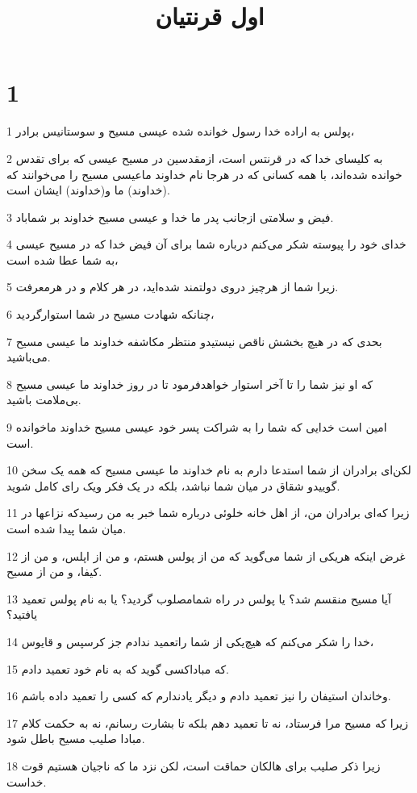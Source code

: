 

\title{اول قرنتيان}


\chapter{1}

\par 1 پولس به اراده خدا رسول خوانده شده عیسی مسیح و سوستانیس برادر،
\par 2 به کلیسای خدا که در قرنتس است، ازمقدسین در مسیح عیسی که برای تقدس خوانده شده‌اند، با همه کسانی که در هرجا نام خداوند ماعیسی مسیح را می‌خوانند که (خداوند) ما و(خداوند) ایشان است.
\par 3 فیض و سلامتی ازجانب پدر ما خدا و عیسی مسیح خداوند بر شماباد.
\par 4 خدای خود را پیوسته شکر می‌کنم درباره شما برای آن فیض خدا که در مسیح عیسی به شما عطا شده است،
\par 5 زیرا شما از هرچیز دروی دولتمند شده‌اید، در هر کلام و در هرمعرفت.
\par 6 چنانکه شهادت مسیح در شما استوارگردید،
\par 7 بحدی که در هیچ بخشش ناقص نیستیدو منتظر مکاشفه خداوند ما عیسی مسیح می‌باشید.
\par 8 که او نیز شما را تا آخر استوار خواهدفرمود تا در روز خداوند ما عیسی مسیح بی‌ملامت باشید.
\par 9 امین است خدایی که شما را به شراکت پسر خود عیسی مسیح خداوند ماخوانده است.
\par 10 لکن‌ای برادران از شما استدعا دارم به نام خداوند ما عیسی مسیح که همه یک سخن گوییدو شقاق در میان شما نباشد، بلکه در یک فکر ویک رای کامل شوید.
\par 11 زیرا که‌ای برادران من، از اهل خانه خلوئی درباره شما خبر به من رسیدکه نزاعها در میان شما پیدا شده است.
\par 12 غرض اینکه هریکی از شما می‌گوید که من از پولس هستم، و من از اپلس، و من از کیفا، و من از مسیح.
\par 13 آیا مسیح منقسم شد؟ یا پولس در راه شمامصلوب گردید؟ یا به نام پولس تعمید یافتید؟
\par 14 خدا را شکر می‌کنم که هیچ‌یکی از شما راتعمید ندادم جز کرسپس و قایوس،
\par 15 که مباداکسی گوید که به نام خود تعمید دادم.
\par 16 وخاندان استیفان را نیز تعمید دادم و دیگر یادندارم که کسی را تعمید داده باشم.
\par 17 زیرا که مسیح مرا فرستاد، نه تا تعمید دهم بلکه تا بشارت رسانم، نه به حکمت کلام مبادا صلیب مسیح باطل شود.
\par 18 زیرا ذکر صلیب برای هالکان حماقت است، لکن نزد ما که ناجیان هستیم قوت خداست.
